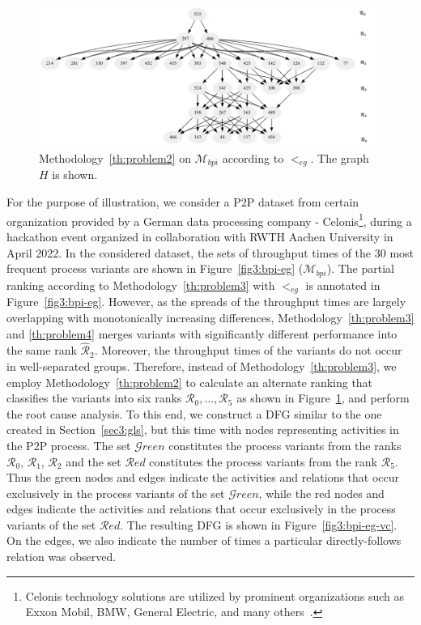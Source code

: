 \documentclass[acmsmall,screen, review]{acmart}
\begin{document}
\begin{figure}[h!]
	\centering
	\includegraphics[width=\textwidth]{fig/ch3/bpi-eg-dfg}
	\caption{Methodology~\ref{th:problem2} on $\mathcal{M}_{bpi}$ according to $<_{eg}$. The graph $H$ is shown.}
	\label{fig3:bpi-eg-dfg}
\end{figure}

For the purpose of illustration, we consider a P2P dataset from certain organization provided by a German data processing company - Celonis\footnote{Celonis technology solutions are utilized by prominent organizations such as Exxon Mobil, BMW, General Electric, and many others~\cite{businesswire2019celonis}.}, during a hackathon event organized in collaboration with RWTH Aachen University in April 2022. 
In the considered dataset,  the sets of throughput times of  the 30 most frequent process variants are shown in Figure~\ref{fig3:bpi-eg} ($\mathcal{M}_{bpi}$). The partial ranking according to Methodology~\ref{th:problem3} with $<_{eg}$ is annotated in Figure~\ref{fig3:bpi-eg}. However, as the spreads of the throughput times are largely overlapping with monotonically increasing differences, Methodology~\ref{th:problem3} and \ref{th:problem4} merges variants with significantly different performance into the same rank $\mathcal{\hat{R}}_2$. Moreover, the throughput times of the variants do not occur in well-separated groups. Therefore, instead of Methodology~\ref{th:problem3}, we employ Methodology~\ref{th:problem2} to calculate an alternate ranking that classifies the variants into six ranks $\mathcal{R}_0, \dots, \mathcal{R}_5$ as shown in Figure~\ref{fig3:bpi-eg-dfg}, and perform the root cause analysis. To this end, we construct a DFG similar to the one created in Section~\ref{sec3:gls}, but this time with nodes representing  activities in the P2P process. The set $\mathcal{G}reen$ constitutes the process variants from the ranks $\mathcal{R}_0$, $\mathcal{R}_1$, $\mathcal{R}_2$ and the set $\mathcal{R}ed$ constitutes the process variants from the rank $\mathcal{R}_5$. Thus the green nodes and edges indicate the activities and relations that occur exclusively in the process variants of the set $\mathcal{G}reen$, while the red nodes and edges indicate the activities and relations that occur exclusively in the process variants of the set $\mathcal{R}ed$. The resulting DFG is shown in Figure~\ref{fig3:bpi-eg-vc}. On the edges, we also indicate the number of times a particular directly-follows relation was observed. 
\end{document}

